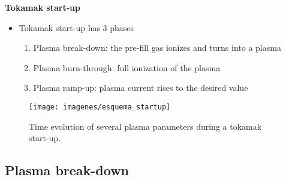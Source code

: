 \documentclass[10pt]{beamer}
\begin{document}
\begin{frame}{\bf Tokamak start-up}
	\begin{minipage}{0.4\textwidth}
		\begin{itemize}
			\item Tokamak start-up has 3 phases			
			\begin{enumerate}
				\item Plasma break-down: the pre-fill gas ionizes and turns into a plasma
				\item Plasma burn-through: full ionization of the plasma
				\item Plasma ramp-up: plasma current rises to the desired value
			\end{enumerate}
		\end{itemize}
	\end{minipage}
%
%
	\begin{minipage}{0.45\textwidth}
		\begin{figure}
		\centering
		\texttt{[image: imagenes/esquema\_startup]}
		\caption{Time evolution of several plasma parameters during a tokamak start-up.}
		\end{figure}
	\end{minipage}
\end{frame}

\subsection{Plasma break-down}
\end{document}
